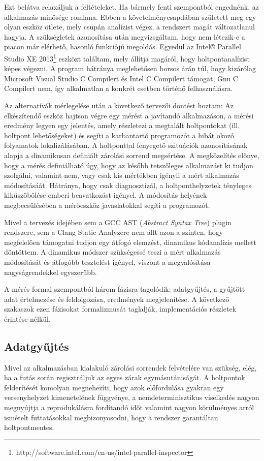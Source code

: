     Ezt belátva relaxáljuk a feltételeket. Ha bármely fenti szempontból engednénk, az alkalmazás minősége romlana. Ebben a követelménycsapdában született meg egy olyan eszköz ötlete, mely csupán analízist végez, a rendszert magát változatlanul hagyja. A szükségletek azonosítása után megvizsgáltam, hogy nem létezik-e a piacon már elérhető, hasonló funkciójú megoldás. Egyedül az Intel® Parallel Studio XE 2013\footnote{http://software.intel.com/en-us/intel-parallel-inspector} eszközt találtam, mely állítja magáról, hogy holtpontanalízist képes végezni. A program hátránya meglehetősen borsos árán túl, hogy kizárólag Microsoft Visual Studio C Compilert és Intel C Compilert támogat, Gnu C Compilert nem, így alkalmatlan a konkrét esetben történő felhasználásra.
    
    Az alternatívák mérlegelése után a következő tervezői döntést hoztam: Az elkészítendő eszköz hajtson végre egy mérést a javítandó alkalmazáson, a mérési eredmény legyen egy jelentés, amely részletezi a megtalált holtpontokat (ill. holtpont lehetőségeket) és segíti a karbantartó programozót a hibát okozó folyamatok lokalizálásában. A holtponttal fenyegető szituációk azonosításának alapja a dinamikusan definiált zárolási sorrend megsértése. A megközelítés előnye, hogy a mérés definiálható úgy, hogy az később tetszőleges alkalmazást ki tudjon szolgálni, valamint nem, vagy csak kis mértékben igényli a mért alkalmazás módosításáát. Hátránya, hogy csak diagnosztizál, a holtponthelyzetek tényleges kiküszöbölése emberi beavatkozást igényel. A módosítás helyének megbecsülésében a mérőeszköz javaslatokkal segíti a programozót.
    
    Mivel a tervezés idejében sem a GCC AST (\emph{Abstract Syntax Tree}) plugin rendszere, sem a Clang Static Analyzere nem állt azon a szinten, hogy megfelelően támogatni tudjon egy átfogó elemzést, dinamikus kódanalízis mellett döntöttem. A dinamikus módszer szükségessé teszi a mért alkalmazás módosítását és átfogóbb tesztelést igényel, viszont a megvalósítása nagyságrendekkel egyszerűbb.
    
    A mérés formai szempontból három fázisra tagolódik: adatgyűjtés, a gyűjtött adat értelmezése és feldolgozása, eredmények megjelenítése. A következő szakaszok ezen fázisokat formalizmusát taglalják, implementációs részletek érintése nélkül.
    
    \subsection{Adatgyűjtés}
    Mivel az alkalmazásban kialakuló zárolási sorrendek felvételére van szükség, elég, ha a futás során regisztráljuk az egyes zárak egymásutániságát. A holtpontok felderítését komolyan megnehezíti, hogy azok előfordulása gyakran egy versenyhelyzet kimenetelének függvénye, a nemdeterminisztikus viselkedés nagyon megnyújtja a reprodukálásra fordítandó időt valamint nagyon körülményes arról ismételt futtatásokkal megbizonyosodni, hogy a rendszer garantáltan holtpontmentes.
    
